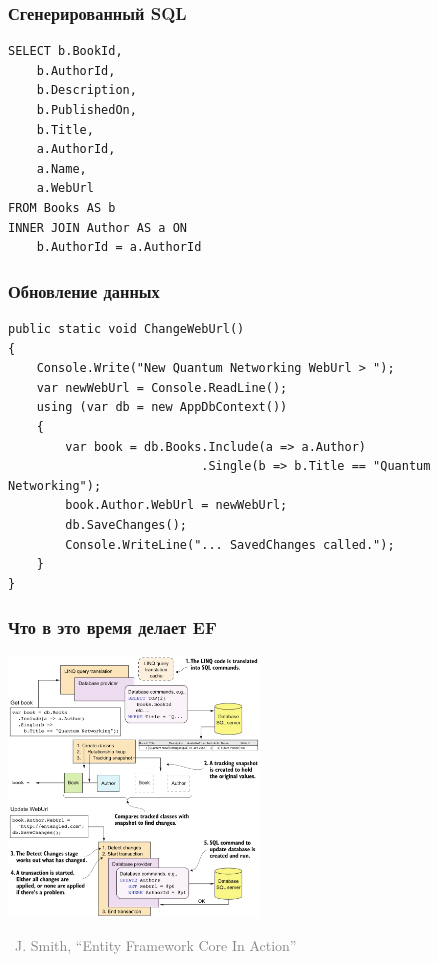 \documentclass[xetex,mathserif,serif]{beamer}
\newcommand{\attribution}[1] {
\vspace{-5mm}\begin{flushright}\begin{scriptsize}\textcolor{gray}{\textcopyright\, #1}\end{scriptsize}\end{flushright}
}
\begin{document}
	\begin{frame}[fragile]
		\frametitle{Сгенерированный SQL}
		\begin{verbatim}
SELECT b.BookId,
    b.AuthorId,
    b.Description,
    b.PublishedOn,
    b.Title,
    a.AuthorId,
    a.Name,
    a.WebUrl
FROM Books AS b
INNER JOIN Author AS a ON
    b.AuthorId = a.AuthorId
		\end{verbatim}
	\end{frame}

	\begin{frame}[fragile]
		\frametitle{Обновление данных}
		\begin{footnotesize}
			\begin{verbatim}
public static void ChangeWebUrl()
{
    Console.Write("New Quantum Networking WebUrl > ");
    var newWebUrl = Console.ReadLine();
    using (var db = new AppDbContext())
    {
        var book = db.Books.Include(a => a.Author)
                           .Single(b => b.Title == "Quantum Networking");
        book.Author.WebUrl = newWebUrl;
        db.SaveChanges();
        Console.WriteLine("... SavedChanges called.");
    }
}
			\end{verbatim}
		\end{footnotesize}
	\end{frame}

	\begin{frame}
		\frametitle{Что в это время делает EF}
		\begin{center}
			\includegraphics[width=0.5\textwidth]{efCoreUpdate.png}
			\attribution{J. Smith, ``Entity Framework Core In Action''}
		\end{center}
	\end{frame}
\end{document}
